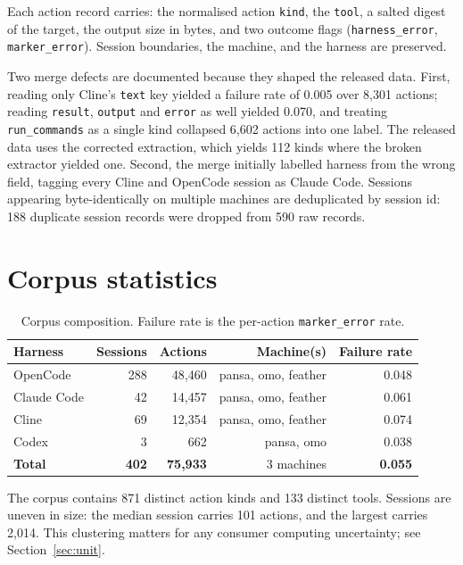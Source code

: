 \documentclass[11pt]{article}
\begin{document}
Each action record carries: the normalised action \texttt{kind}, the
\texttt{tool}, a salted digest of the target, the output size in bytes, and
two outcome flags (\texttt{harness\_error}, \texttt{marker\_error}). Session
boundaries, the machine, and the harness are preserved.

Two merge defects are documented because they shaped the released data.
First, reading only Cline's \texttt{text} key yielded a failure rate of
0.005 over 8,301 actions; reading \texttt{result}, \texttt{output} and
\texttt{error} as well yielded 0.070, and treating \texttt{run\_commands}
as a single kind collapsed 6,602 actions into one label. The released data
uses the corrected extraction, which yields 112 kinds where the broken
extractor yielded one. Second, the merge initially labelled harness from
the wrong field, tagging every Cline and OpenCode session as Claude Code.
Sessions appearing byte-identically on multiple machines are deduplicated
by session id: 188 duplicate session records were dropped from 590 raw
records.

\section{Corpus statistics}

\begin{table}[h]
\centering
\begin{tabular}{lrrrr}
\toprule
\textbf{Harness} & \textbf{Sessions} & \textbf{Actions} & \textbf{Machine(s)} & \textbf{Failure rate} \\
\midrule
OpenCode   & 288 & 48,460 & pansa, omo, feather & 0.048 \\
Claude Code & 42 & 14,457 & pansa, omo, feather & 0.061 \\
Cline      & 69 & 12,354 & pansa, omo, feather & 0.074 \\
Codex      & 3  &    662 & pansa, omo          & 0.038 \\
\midrule
\textbf{Total} & \textbf{402} & \textbf{75,933} & 3 machines & \textbf{0.055} \\
\bottomrule
\end{tabular}
\caption{Corpus composition. Failure rate is the per-action
\texttt{marker\_error} rate.}
\label{tab:corpus}
\end{table}

The corpus contains 871 distinct action kinds and 133 distinct tools.
Sessions are uneven in size: the median session carries 101 actions, and
the largest carries 2,014. This clustering matters for any consumer
computing uncertainty; see Section~\ref{sec:unit}.
\end{document}
